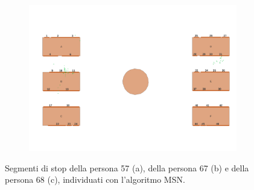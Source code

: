 \documentclass[12pt]{article}
\begin{document}
\begin{figure}[htb!]
\begin{subfigure}[b]{0.3\textwidth}
        \includegraphics[width=\textwidth]{images/stop_points_p68_MSN.png}
        \caption{}
        \label{stop_segments_p68_MSN}
    \end{subfigure}
    \hfill
    \caption{Segmenti di stop della persona 57 (a), della persona 67 (b) e della persona 68 (c), individuati con l'algoritmo MSN.}
    \label{stop_segments_MSN}
\end{figure}

\clearpage
\end{document}
